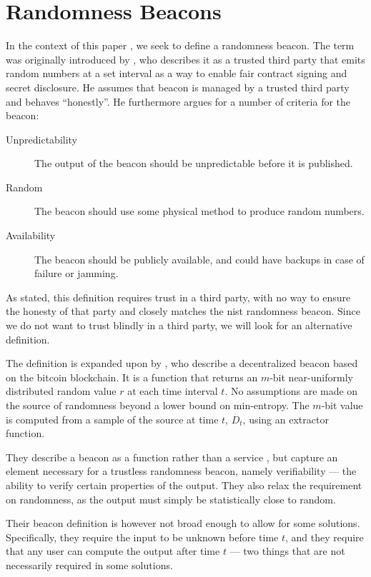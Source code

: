 \section{Randomness Beacons}\label{sec:beacons}

In the context of this paper , we seek to define a randomness beacon.
The term was originally introduced by \citet{rabin1983transaction}, who describes it as a trusted third party that emits random numbers at a set interval as a way to enable fair contract signing and secret disclosure.
He assumes that beacon is managed by a trusted third party and behaves \enquote{honestly}. He furthermore argues for a number of criteria for the beacon:

\begin{description}
    \item[Unpredictability] The output of the beacon should be unpredictable before it is published.
    \item[Random] The beacon should use some physical method to produce random numbers.
    \item[Availability] The beacon should be publicly available, and could have backups in case of failure or jamming.
\end{description}

As stated, this definition requires trust in a third party, with no way to ensure the honesty of that party and closely matches the \gls{nist} randomness beacon.
Since we do not want to trust blindly in a third party, we will look for an alternative definition.

The definition is expanded upon by \citet{bonneau2015bitcoin}, who describe a decentralized beacon based on the bitcoin blockchain.
It is a function that returns an $m$-bit near-uniformly distributed random value $r$ at each time interval $t$.
No assumptions are made on the source of randomness beyond a lower bound on min-entropy.
The $m$-bit value is computed from a sample of the source at time $t$, $D_t$, using an extractor function.

They describe a beacon as a function rather than a service , but capture an element necessary for a trustless randomness beacon, namely verifiability --- the ability to verify certain properties of the output.
They also relax the requirement on randomness, as the output must simply be statistically close to random.

Their beacon definition is however not broad enough to allow for some solutions. Specifically, they require the input to be unknown before time $t$, and they require that any user can compute the output after time $t$ --- two things that are not necessarily required in some solutions.

